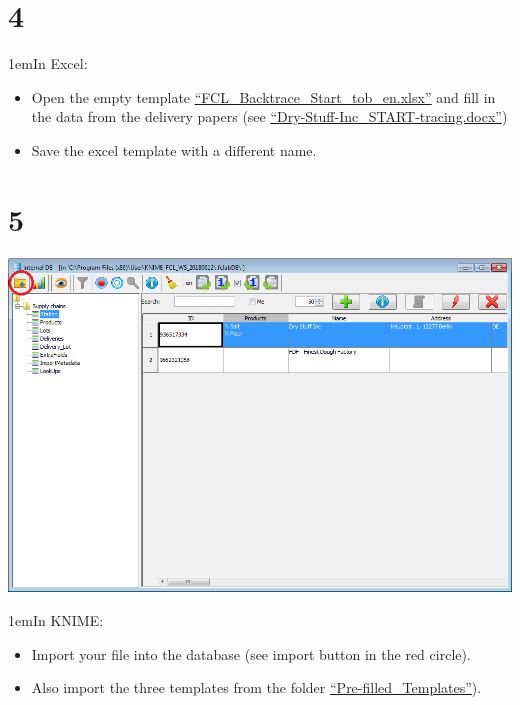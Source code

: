 \documentclass[10pt]{beamer}
\begin{document}
\section{4}
\begin{frame}
\leftskip1em{In Excel:}
	\begin{itemize}
		\item Open the empty template \textcolor{blue}{\underline{\href{https://foodrisklabs.bfr.bund.de/wp-content/uploads/2015/11/FCL\_Backtrace\_Start\_tob\_en.xlsx}{``FCL\_Backtrace\_Start\_tob\_en.xlsx''}}} and fill in the data from the delivery papers (see \textcolor{blue}{\underline{\href{https://github.com/SiLeBAT/BfROpenLabResources/raw/master/GitHubPages/documents/FCL\_Data\_collection\_and\_import/Dry-Stuff-Inc_START-tracing.docx}{``Dry-Stuff-Inc\_START-tracing.docx''}}})
		\item Save the excel template with a different name.
	\end{itemize}
\end{frame}

\section{5}
\begin{frame}
	\begin{center}
			\includegraphics[height=0.6\textheight]{5.png}
	\end{center}
\leftskip1em{In KNIME:}
	\begin{itemize}
		\item Import your file into the database (see import button in the red circle).
		\item Also import the three templates from the folder  \textcolor{blue}{\underline{\href{https://github.com/SiLeBAT/BfROpenLabResources/raw/master/GitHubPages/documents/FCL\_Data\_collection\_and\_import/Pre-filled\_Templates}{``Pre-filled\_Templates''}}}).
	\end{itemize}
\end{frame}
\end{document}
